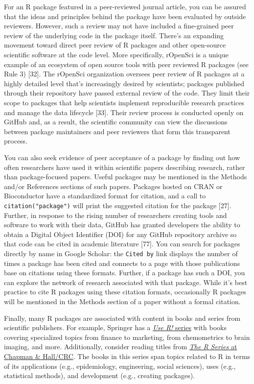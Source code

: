 \documentclass[10pt,letterpaper]{article}
\begin{document}
For an R package featured in a peer-reviewed journal article, you can be
assured that the ideas and principles behind the package have been
evaluated by outside reviewers. However, such a review may not have
included a fine-grained peer review of the underlying code in the
package itself. There's an expanding movement toward direct peer review
of R packages and other open-source scientific software at the code
level. More specifically, rOpenSci is a unique example of an ecosystem
of open source tools with peer reviewed R packages (see Rule 3)
{[}32{]}. The rOpenSci organization oversees peer review of R packages
at a highly detailed level that's increasingly desired by scientists;
packages published through their repository have passed external review
of the code. They limit their scope to packages that help scientists
implement reproducible research practices and manage the data lifecycle
{[}33{]}. Their review process is conducted openly on GitHub and, as a
result, the scientific community can view the discussions between
package maintainers and peer reviewers that form this transparent
process.

You can also seek evidence of peer acceptance of a package by finding
out how often researchers have used it within scientific papers
describing research, rather than package-focused papers. Useful packages
may be mentioned in the Methods and/or References sections of such
papers. Packages hosted on CRAN or Bioconductor have a standardized
format for citation, and a call to \texttt{citation("package")} will
print the suggested citation for the package {[}27{]}. Further, in
response to the rising number of researchers creating tools and software
to work with their data, GitHub has granted developers the ability to
obtain a Digital Object Identifier (DOI) for any GitHub repository
archive so that code can be cited in academic literature {[}77{]}. You
can search for packages directly by name in Google Scholar: the
\texttt{Cited\ by} link displays the number of times a package has been
cited and connects to a page with those publications base on citations
using these formats. Further, if a package has such a DOI, you can
explore the network of research associated with that package. While it's
best practice to cite R packages using these citation formats,
occasionally R packages will be mentioned in the Methods section of a
paper without a formal citation.

Finally, many R packages are associated with content in books and series
from scientific publishers. For example, Springer has a
\href{https://www.springer.com/series/6991}{\emph{Use R!} series} with
books covering specialized topics from finance to marketing, from
chemometrics to brain imaging, and more. Additionally, consider reading
titles from
\href{https://www.routledge.com/Chapman--HallCRC-The-R-Series/book-series/CRCTHERSER}{\emph{The
R Series} at Chapman \& Hall/CRC}. The books in this series span topics
related to R in terms of its applications (e.g., epidemiology,
engineering, social sciences), uses (e.g., statistical methods), and
development (e.g., creating packages).
\end{document}
